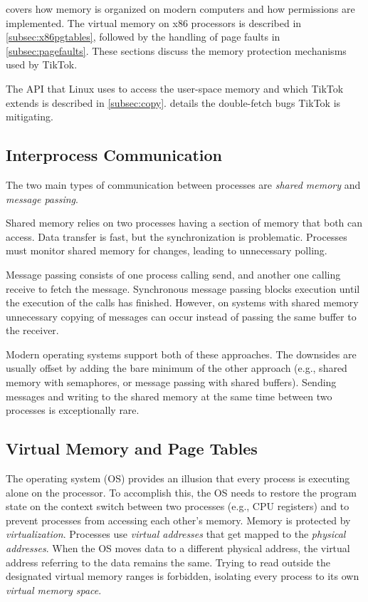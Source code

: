  covers how memory is organized on modern computers and how
permissions are implemented. The virtual memory on x86 processors is described
in \cref{subsec:x86pgtables}, followed by the handling of page faults in
\cref{subsec:pagefaults}. These sections discuss the memory protection
mechanisms used by TikTok.

The API that Linux uses to access the user-space memory and which TikTok extends is
described in \cref{subsec:copy}.  details the
double-fetch bugs TikTok is mitigating.

\subsection{Interprocess Communication}
\label{subsec:ipc}

The two main types of communication between processes are \emph{shared memory} 
and \emph{message passing}\cite{silberschatz2018operating}.

Shared memory relies on two processes having a section of memory that both can 
access. Data transfer is fast, but the synchronization is problematic. 
Processes must monitor shared memory for changes, leading to unnecessary
polling.

Message passing consists of one process calling send, and another one calling
receive to fetch the message. Synchronous message passing blocks execution until
the execution of the calls has finished. However, on systems with shared memory
unnecessary copying of messages can occur instead of passing the same buffer to
the receiver.

Modern operating systems support both of these approaches. The downsides are
usually offset by adding the  bare minimum of the other approach (e.g., shared
memory with semaphores, or message passing with shared buffers). Sending
messages and writing to the shared memory at the same time between two processes
is exceptionally rare.

\subsection{Virtual Memory and Page Tables} \label{subsec:vm}

The operating system (OS) provides an illusion that every process is executing
alone on the processor. To accomplish this, the OS needs to restore the program
state on the context switch between two processes (e.g., CPU registers) and to
prevent processes from accessing each other's memory. Memory is protected by
\emph{virtualization}. Processes use \emph{virtual addresses} that get mapped to
the \emph{physical addresses}. When the OS moves data to a different physical
address, the virtual address referring to the data remains the same. Trying to
read outside the designated virtual memory ranges is forbidden, isolating every
process to its own \emph{virtual memory space}.


